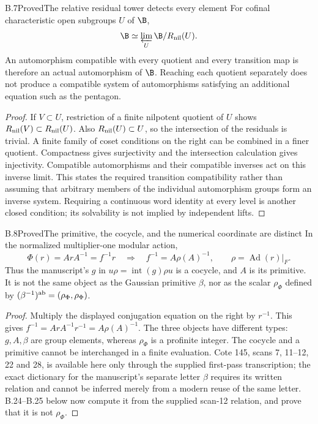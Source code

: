 \begin{statement}{B.7}{Proved}{The relative residual tower detects every element}
For cofinal characteristic open subgroups $U$ of $\B$,
\[
 \B\simeq\varprojlim_U\B/R_{\rm nil}(U).
\]
An automorphism compatible with every quotient and
every transition map is therefore an actual automorphism
of $\B$. Reaching each quotient separately does not
produce a compatible system of automorphisms satisfying
an additional equation such as the pentagon.
\end{statement}
\begin{proof}
If $V\subset U$, restriction of a finite nilpotent
quotient of $U$ shows
$R_{\rm nil}(V)\subset R_{\rm nil}(U)$.
Also $R_{\rm nil}(U)\subset U$, so the intersection
of the residuals is trivial. A finite family of coset
conditions on the right can be combined in a finer
quotient. Compactness gives surjectivity and the
intersection calculation gives injectivity. Compatible
automorphisms and their compatible inverses act on
this inverse limit. This states the required transition
compatibility rather than assuming that arbitrary
members of the individual automorphism groups form
an inverse system. Requiring a continuous word
identity at every level is another closed condition;
its solvability is not implied by independent lifts.
\end{proof}

\begin{statement}{B.8}{Proved}{The primitive, the cocycle, and the numerical coordinate are distinct}
In the normalized multiplier-one modular action,
\[
 \Phi(r)=ArA^{-1}=f^{-1}r
 \quad\Longrightarrow\quad
 f^{-1}=A\rho(A)^{-1},\qquad \rho=\operatorname{Ad}(r)|_F.
\]
Thus the manuscript's $g$ in
$u\rho=\operatorname{int}(g)\rho u$ is a cocycle,
and $A$ is its primitive. It is not the same object
as the Gaussian primitive $\beta$, nor as the scalar
$\rho_\Phi$ defined by
$(\beta^{-1})^{\rm ab}=(\rho_\Phi,\rho_\Phi)$.
\end{statement}
\begin{proof}
Multiply the displayed conjugation equation on the
right by $r^{-1}$. This gives
$f^{-1}=ArA^{-1}r^{-1}=A\rho(A)^{-1}$.
The three objects have different types: $g,A,\beta$
are group elements, whereas $\rho_\Phi$ is a profinite
integer. The cocycle and a primitive cannot be
interchanged in a finite evaluation. Cote 145,
scans 7, 11--12, 22 and 28, is available here only
through the supplied first-pass transcription;
the exact dictionary for the manuscript's separate
letter $\beta$ requires its written relation and
cannot be inferred merely from a modern reuse of
the same letter. B.24--B.25 below now compute it from the supplied scan-12 relation,
and prove that it is not $\rho_\Phi$.
\end{proof}

